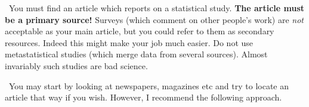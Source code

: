 \vspace{0.2in}

\par{}\ You
must find an article which reports on a statistical study.
{\bf The article must be a primary source!}  Surveys (which comment on other
people's work) are {\it not\/} acceptable as your main article, but you
could
refer to them as secondary resources.  Indeed this might make your job much
easier.  Do not use metastatistical studies (which merge data from several
sources).  Almost invariably such studies are bad science.

\vspace{0.2in}

\par{}\ You may start by
looking at newspapers, magazines etc and try to locate an article that way
if you wish. However,
I recommend the
following approach.
